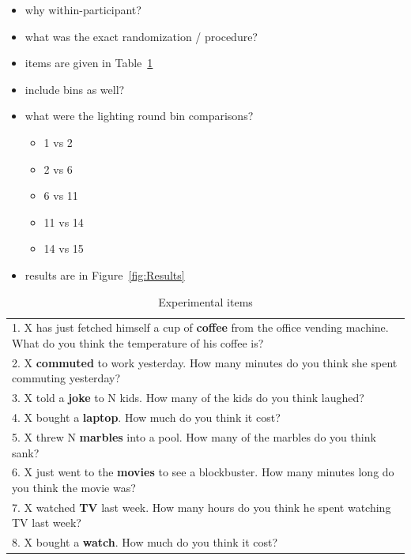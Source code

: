 \documentclass[10pt,letterpaper]{article}
\begin{document}
\begin{itemize}
\item why within-participant?
\item what was the exact randomization / procedure?
\item items are given in Table~\ref{tab:Items}
\item include bins as well?
\item what were the lighting round bin comparisons?
  \begin{itemize}
  \item 1 vs 2
  \item 2 vs 6
  \item 6 vs 11
  \item 11 vs 14
  \item 14 vs 15
  \end{itemize}
\item results are in Figure~\ref{fig:Results}
\end{itemize}

\begin{table}
  \centering
  \begin{tabular}{p{8cm}}
    1.  X has just fetched himself a cup of \textbf{coffee} from the office vending machine.
         What do you think the temperature of his coffee is?  \\
    2.  X \textbf{commuted} to work yesterday. 
        How many minutes do you think she spent commuting yesterday? \\
3.  X told a \textbf{joke} to N kids. 
    How many of the kids do you think laughed?\\
    
4.  X bought a \textbf{laptop}.    
    How much do you think it cost?\\
    
5.  X threw N \textbf{marbles} into a pool.
    How many of the marbles do you think sank?\\

6.  X just went to the \textbf{movies} to see a blockbuster.
    How many minutes long do you think the movie was?\\

7.  X watched \textbf{TV} last week.
    How many hours do you think he spent watching TV last week? \\

8.  X bought a \textbf{watch}.
    How much do you think it cost?
  \end{tabular}
  \caption{Experimental items}
  \label{tab:Items}
\end{table}
\end{document}
